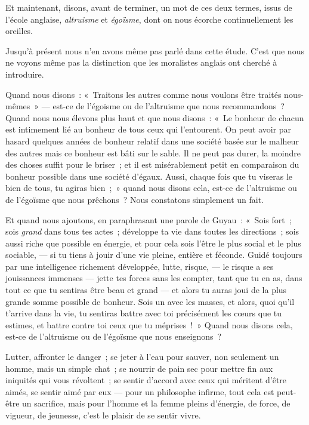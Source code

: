 \documentclass[french,twoside]{book} %
\begin{document}
\noindent Et maintenant, disons, avant de terminer, un mot de ces deux termes, issus de l’école anglaise, \emph{altruisme} et \emph{égoïsme}, dont on nous écorche continuellement les oreilles.\par
Jusqu’à présent nous n’en avons même pas parlé dans cette étude. C’est que nous ne voyons même pas la distinction que les moralistes anglais ont cherché à introduire.\par
Quand nous disons : « Traitons les autres comme nous voulons être traités nous-mêmes » — est-ce de l’égoïsme ou de l’altruisme que nous recommandons ? Quand nous nous élevons plus haut et que nous disons : « Le bonheur de chacun est intimement lié au bonheur de tous ceux qui l’entourent. On peut avoir par hasard quelques années de bonheur relatif dans une société basée sur le malheur des autres mais ce bonheur est bâti sur le sable. Il ne peut pas durer, la moindre des choses suffit pour le briser ; et il est misérablement petit en comparaison du bonheur possible dans une société d’égaux. Aussi, chaque fois que tu viseras le bien de tous, tu agiras bien ; » quand nous disons cela, est-ce de l’altruisme ou de l’égoïsme que nous prêchons ? Nous constatons simplement un fait.\par
 Et quand nous ajoutons, en paraphrasant une parole de Guyau : « Sois fort ; sois \emph{grand} dans tous tes actes ; développe ta vie dans toutes les directions ; sois aussi riche que possible en énergie, et pour cela sois l’être le plus social et le plus sociable, — si tu tiens à jouir d’une vie pleine, entière et féconde. Guidé toujours par une intelligence richement développée, lutte, risque, — le risque a ses jouissances immenses — jette tes forces sans les compter, tant que tu en as, dans tout ce que tu sentiras être beau et grand — et alors tu auras joui de la plus grande somme possible de bonheur. Sois un avec les masses, et alors, quoi qu’il t’arrive dans la vie, tu sentiras battre avec toi précisément les cœurs que tu estimes, et battre contre toi ceux que tu méprises ! » Quand nous disons cela, est-ce de l’altruisme ou de l’égoïsme que nous enseignons ?\par
Lutter, affronter le danger ; se jeter à l’eau pour sauver, non seulement un homme, mais un simple chat ; se nourrir de pain sec pour mettre fin aux iniquités qui vous révoltent ; se sentir d’accord avec ceux qui méritent d’être aimés, se sentir aimé par eux — pour un philosophe infirme, tout cela est peut-être un sacrifice, mais pour l’homme et la femme pleins d’énergie, de force, de vigueur, de jeunesse, c’est le plaisir de se sentir vivre.\par
\end{document}
